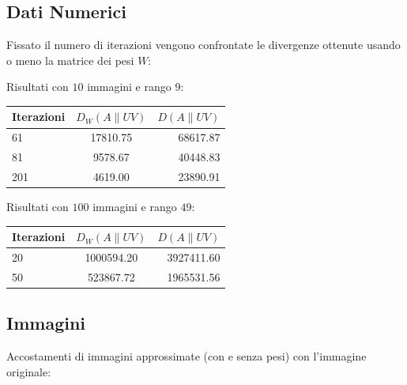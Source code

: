 \documentclass[a4paper]{article} %
\begin{document}
\subsection{Dati Numerici}
Fissato il numero di iterazioni vengono confrontate le divergenze ottenute usando o meno la matrice dei pesi $W$:

\begin{center}
  Risultati con $10$ immagini e rango $9$: \\

  \begin{tabular}{| l | c | r |}
    \hline
    Iterazioni & $D_W(A\lVert UV)$ & $D(A\lVert UV)$ \\
    \hline
    61 & 17810.75 & 68617.87 \\
    81 &  9578.67 & 40448.83 \\
    201 & 4619.00 & 23890.91 \\
    \hline
  \end{tabular}
  \vspace{0.5cm}

  Risultati con $100$ immagini e rango $49$: \\

  \begin{tabular}{| l | c | r |}
    \hline
    Iterazioni & $D_W(A\lVert UV)$ & $D(A\lVert UV)$ \\
    \hline
    20 & 1000594.20 & 3927411.60 \\
    50 &  523867.72 & 1965531.56 \\
    \hline
  \end{tabular}

\end{center}

\subsection{Immagini}
Accostamenti di immagini approssimate (con e senza pesi) con l'immagine originale:
\end{document}
